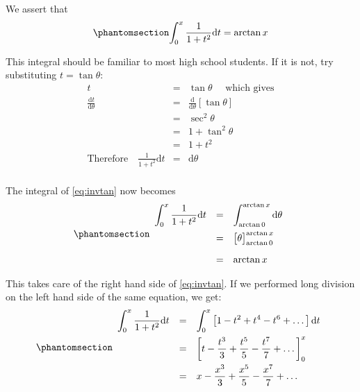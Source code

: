 \documentclass[
  a4paper,
]{article}
\begin{document}
We assert that \begin{equation}\phantomsection\label{eq:invtan}{
\int_{0}^{x}\frac{1}{1+ t^2}{\mathrm{d}} t = \arctan{x}
}\end{equation}

This integral should be familiar to most high school students. If it is
not, try substituting \(t = \tan \theta\): \[
\begin{array}{rcl}
t & = & \tan \theta \quad \mbox{ which gives} \\
\displaystyle \frac{\mathrm{d}t}{\mathrm{d}\theta} & = & \displaystyle \frac{\mathrm{d}}{\mathrm{d}\theta}\left[ \tan \theta \right] \\
& = & \sec^2 \theta \\
& = & 1 + \tan^2 \theta \\
& = & 1 + t^2\\
\mbox{Therefore}\quad\frac{1}{1 + t^2}\mathrm{d} t & = & \mathrm{d}\theta\\
\end{array}
\]

The integral of \cref{eq:invtan} now becomes
\begin{equation}\phantomsection\label{eq:right}{
\begin{array}{rcl}
\displaystyle \int_{0}^{x}\frac{1}{1+ t^2}\mathrm{d}t %
& = & \displaystyle \int_{\arctan0}^{\arctan x} \mathrm{d}\theta\\[1em]
& = & \big[ \theta\big]^{\arctan x}_{\arctan0} \\[1em]
& = & \arctan x
\end{array}
}\end{equation}

This takes care of the right hand side of \cref{eq:invtan}. If we
performed long division on the left hand side of the same equation, we
get: \begin{equation}\phantomsection\label{eq:left}{
\begin{array}{rcl}
\displaystyle \int_{0}^{x}\frac{1}{1+ t^2}\mathrm{d}t %
& = & \displaystyle \int_{0}^{x}%
\left[ 1 - t^2 + t^4 - t^6 +\dots \right] \mathrm{d}t \\[1em]
& = & \displaystyle \left[ t - \frac{t^3}{3} + \frac{t^5}{5} - \frac{t^7}{7}+ \dots \right]_{0}^{x}\\[1em]
& = & \displaystyle x - \frac{x^3}{3} + \frac{x^5}{5} - \frac{x^7}{7}+ \dots
\end{array}
}\end{equation}
\end{document}
